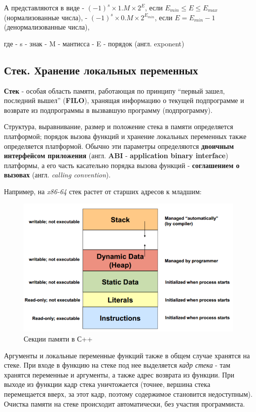 А представляются в виде - \((-1)^s \times 1.M \times 2^E\), если
\(E_{min} \le E \le E_{max}\) (нормализованные числа), -
\((-1)^s \times 0.M \times 2^{E_{min}}\), если \(E=E_{min}-1\)
(денормализованные числа),

где - s - знак - M - мантисса - E - порядок (англ. exponent)

\subsection{Стек. Хранение локальных
переменных}\label{ux441ux442ux435ux43a.-ux445ux440ux430ux43dux435ux43dux438ux435-ux43bux43eux43aux430ux43bux44cux43dux44bux445-ux43fux435ux440ux435ux43cux435ux43dux43dux44bux445}

\textbf{Стек} - особая область памяти, работающая по принципу ``первый
зашел, последний вышел'' (\textbf{FILO}), хранящая информацию о текущей
подпрограмме и возврате из подпрограммы в вызвавшую программу
(подпрограмму).

Структура, выравнивание, размер и положение стека в памяти определяется
платформой; порядок вызова функций и хранение локальных переменных также
определяется платформой. Обычно эти параметры определяются
\textbf{двоичным интерфейсом приложения} (англ. \textbf{ABI} -
\textbf{application binary interface}) платформы, а его часть касательно
порядка вызова функций - \textbf{соглашением о вызовах} (англ.
\emph{calling convention}).

Например, на \emph{x86-64} стек растет от старших адресов к младшим:

\begin{figure}
\centering
\includegraphics{./res/mem.png}
\caption{Секции памяти в С++}
\end{figure}

Аргументы и локальные переменные функций также в общем случае хранятся
на стеке. При входе в функцию на стеке под нее выделяется \emph{кадр
стека} - там хранятся переменные и аргументы, а также адрес возврата из
функции. При выходе из функции кадр стека уничтожается (точнее, вершина
стека перемещается вверх, за этот кадр, поэтому содержимое становится
недоступным). Очистка памяти на стеке происходит автоматически, без
участия программиста.
